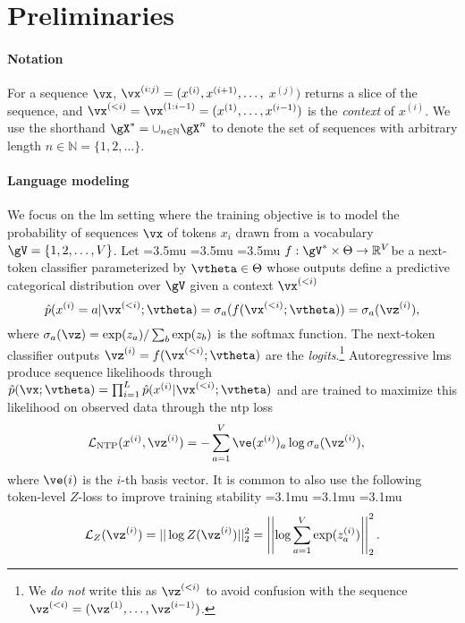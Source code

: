 \section{Preliminaries}
\label{sec:preliminaries}

\paragraph{Notation}
For a sequence
$\vx$,
$\vx^{(i:j)}=(x^{(i)},x^{(i+1)},\ldots,$ $x^{(j)})$
returns a slice of the sequence,
and
$\vx^{(<i)}=\vx^{(1:i-1)}=(x^{(1)},\ldots,x^{(i-1)})$ is the \emph{context} of $x^{(i)}$.
We use the shorthand
$\gX^*=\cup_{n\in\mathbb{N}}\gX^n$
to denote the set of sequences
with arbitrary length $n\in\mathbb{N} =\{1,2,\ldots\}$.

\paragraph{Language modeling}
We focus on the \gls{lm} setting where the training objective is to model the probability of sequences $\vx$ of tokens $x_i$ drawn from a vocabulary
$\gV=\{1,2,\ldots,V\}$. Let
{
	\medmuskip=3.5mu
	\thinmuskip=3.5mu
	\thickmuskip=3.5mu
$f:\gV^*\times \Theta\rightarrow \mathbb R^V$}be a next-token classifier parameterized by
$\vtheta \in\Theta$
whose outputs define a predictive categorical
distribution over $\gV$ given a context $\vx^{(<i)}$
\begin{equation}
	\hat p(x^{(i)}=a|\vx^{(<i)};\vtheta)
	=\sigma_a (f(\vx^{(<i)};\vtheta))
	=\sigma_a (\vz^{(i)}),
\end{equation}
where
$
	\sigma_a(\vz)=
	\exp(z_a)/\sum_b \exp(z_b)
$
is the softmax function.
The next-token classifier outputs
$\vz^{(i)}=f(\vx^{(<i)};\vtheta)$
are the \emph{logits}.\footnote{
	We \emph{do not} write this as $\vz^{(<i)}$ to avoid confusion with the sequence
	$\vz^{(<i)}=(\vz^{(1)},\ldots,\vz^{(i-1)})$.
}
Autoregressive \glspl{lm} produce sequence likelihoods through $\hat p(\vx;\vtheta)
	=\prod_{i=1}^L\hat p(x^{(i)}|\vx^{(<i)};\vtheta)$
and are trained to maximize this likelihood on observed data through the \gls{ntp} loss
\begin{align}
	\Ls_{\text{NTP}}(x^{(i)},\vz^{(i)}) & =
	-\sum_{a=1}^V \ve(x^{(i)})_a\log \sigma_a(\vz^{(i)}),
	\label{eq:ntp-cross-entropy}
\end{align}
where $\ve(i)$ is the $i$-th basis vector.
It is common to also use the following token-level $Z$-loss to improve training stability \citep{DBLP:journals/jmlr/ChowdheryNDBMRBCSGSSTMRBTSPRDHPBAI23,DBLP:journals/corr/abs-2309-14322}
{
	\medmuskip=3.1mu
	\thinmuskip=3.1mu
	\thickmuskip=3.1mu
	\begin{align}
		\Ls_Z(\vz^{(i)})
		=||\log Z(\vz^{(i)})||_2^2
		=\left|\left|\log \sum_{a=1}^V\exp(z_a^{(i)})\right|\right|_2^2.
	\end{align}
}

